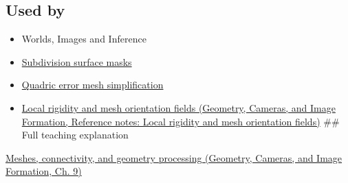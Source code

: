 \subsection{Used by}\label{appendix-1aea26b2307f-used-by}

\hypertarget{appendix-1aea26b2307f-used-by}{}

\begin{itemize}
\item
  {Worlds, Images and Inference}
\item
  \hyperref[appendix-0234ab7f86b1]{Subdivision surface masks}
\item
  \hyperref[appendix-1dd4ad54ca57]{Quadric error mesh simplification}
\item
  \href{../03-Geometry-Cameras-and-Image-Formation/main.pdf\#nameddest=appendix-7107009c505b}{Local rigidity and mesh orientation fields (Geometry, Cameras, and Image Formation, Reference notes: Local rigidity and mesh orientation fields)} \#\# Full teaching explanation
\end{itemize}

\href{../03-Geometry-Cameras-and-Image-Formation/main.pdf\#nameddest=03-visual-computing-i-ch002-meshes-connectivity-and-geometry-processing}{Meshes, connectivity, and geometry processing (Geometry, Cameras, and Image Formation, Ch. 9)}
